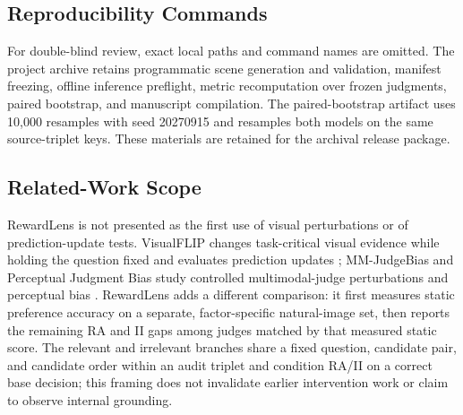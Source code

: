 \subsection{Reproducibility Commands}
\label{app:reproducibility-commands}

For double-blind review, exact local paths and command names are omitted. The
project archive retains programmatic scene generation and validation, manifest
freezing, offline inference preflight, metric recomputation over frozen
judgments, paired bootstrap, and manuscript compilation. The paired-bootstrap
artifact uses 10,000 resamples with seed 20270915 and resamples both models on
the same source-triplet keys. These materials are retained for the archival
release package.

\subsection{Related-Work Scope}
\label{app:related-work-scope}

RewardLens is not presented as the first use of visual perturbations or of
prediction-update tests. VisualFLIP changes task-critical visual evidence while
holding the question fixed and evaluates prediction updates
\citep{zhu2026visualflip}; MM-JudgeBias and Perceptual Judgment Bias study controlled
multimodal-judge perturbations and perceptual bias
\citep{lee2026mmjudgebias,park2026mitigating}. RewardLens adds a different
comparison: it first measures static preference accuracy on a separate,
factor-specific natural-image set, then reports the remaining RA and II gaps
among judges matched by that measured static score. The relevant and irrelevant
branches share a fixed question, candidate pair, and candidate order within an
audit triplet and condition RA/II on a correct base decision; this framing does
not invalidate earlier intervention work or claim to observe internal
grounding.
